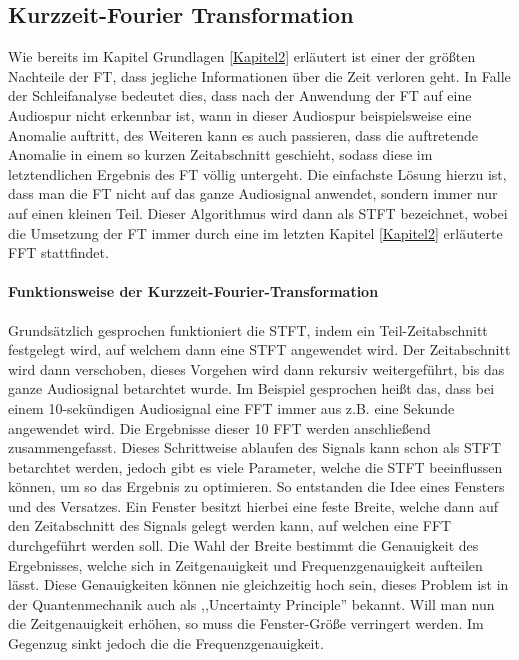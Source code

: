 \subsection{Kurzzeit-Fourier Transformation}
    
Wie bereits im Kapitel Grundlagen \ref{Kapitel2} erläutert ist einer der größten Nachteile der \ac{FT}, dass jegliche Informationen über die Zeit verloren geht. In Falle der Schleifanalyse bedeutet dies, dass nach der Anwendung der \ac{FT} auf eine Audiospur nicht erkennbar ist, wann in dieser Audiospur beispielsweise eine Anomalie auftritt, des Weiteren kann es auch passieren, dass die auftretende Anomalie in einem so kurzen Zeitabschnitt geschieht, sodass diese im letztendlichen Ergebnis des \ac{FT} völlig untergeht. Die einfachste Lösung hierzu ist, dass man die \ac{FT} nicht auf das ganze Audiosignal anwendet, sondern immer nur auf einen kleinen Teil. Dieser Algorithmus wird dann als \ac{STFT} bezeichnet, wobei die Umsetzung der \ac{FT} immer durch eine im letzten Kapitel \ref{Kapitel2} erläuterte \ac{FFT} stattfindet. \cite{Okumura2011}

\paragraph{Funktionsweise der Kurzzeit-Fourier-Transformation}
    
Grundsätzlich gesprochen funktioniert die \ac{STFT}, indem ein Teil-Zeitabschnitt festgelegt wird, auf welchem dann eine \ac{STFT} angewendet wird. Der Zeitabschnitt wird dann verschoben, dieses Vorgehen wird dann rekursiv weitergeführt, bis das ganze Audiosignal betarchtet wurde. Im Beispiel gesprochen heißt das, dass bei einem 10-sekündigen Audiosignal eine \ac{FFT} immer aus z.B. eine Sekunde angewendet wird. Die Ergebnisse dieser 10 \ac{FFT} werden anschließend zusammengefasst. \cite[69]{Kiencke2008}
Dieses Schrittweise ablaufen des Signals kann schon als \ac{STFT} betarchtet werden, jedoch gibt es viele Parameter, welche die \ac{STFT} beeinflussen können, um so das Ergebnis zu optimieren. So entstanden die Idee eines Fensters und des Versatzes. \cite[5f.]{Okumura2011} Ein Fenster besitzt hierbei eine feste Breite, welche dann auf den Zeitabschnitt des Signals gelegt werden kann, auf welchen eine \ac{FFT} durchgeführt werden soll. Die Wahl der Breite bestimmt die Genauigkeit des Ergebnisses, welche sich in Zeitgenauigkeit und Frequenzgenauigkeit aufteilen lässt. \cite{jacobsen2003} Diese Genauigkeiten können nie gleichzeitig hoch sein, dieses Problem ist in der Quantenmechanik auch als ,,Uncertainty Principle'' bekannt. \cite{uncertainty2024} Will man nun die Zeitgenauigkeit erhöhen, so  muss die Fenster-Größe verringert werden. Im Gegenzug sinkt jedoch die die Frequenzgenauigkeit. 
    
